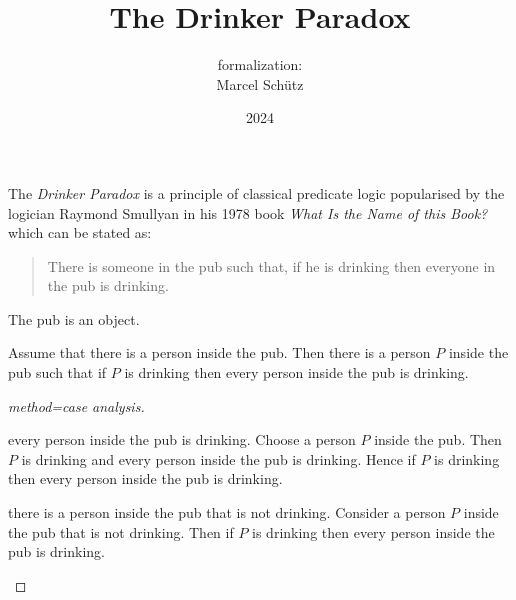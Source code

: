 \documentclass{article}
\title{The Drinker Paradox}
\author{\Naproche formalization:\\[0.5em]Marcel Schütz}
\date{2024}
\begin{document}
  \maketitle

  \begin{forthel}
  \end{forthel}

  \noindent The \emph{Drinker Paradox} is a principle of classical predicate 
  logic popularised by the logician Raymond Smullyan in his 1978 book
  \textit{What Is the Name of this Book?} \cite{Smullyan1978} which can be 
  stated as:

  \begin{quotation}
    \noindent There is someone in the pub such that, if he is drinking then 
    everyone in the pub is drinking.
  \end{quotation}

  \begin{forthel}
    \begin{signature*}
      The pub is an object.
    \end{signature*}
    
    \begin{theorem*}[title=Drinker Paradox,id=drinker_paradox]
      Assume that there is a person inside the pub.
      Then there is a person $P$ inside the pub such that if $P$ is drinking then every person inside the pub is drinking.
    \end{theorem*}
    \begin{proof}[method=case analysis]
      \begin{case}{every person inside the pub is drinking.}
        Choose a person $P$ inside the pub.
        Then $P$ is drinking and every person inside the pub is drinking.
        Hence if $P$ is drinking then every person inside the pub is drinking.
      \end{case}
    
      \begin{case}{there is a person inside the pub that is not drinking.}
        Consider a person $P$ inside the pub that is not drinking.
        Then if $P$ is drinking then every person inside the pub is drinking.
      \end{case}
    \end{proof}
  \end{forthel}

  \printbibliography
\end{document}
